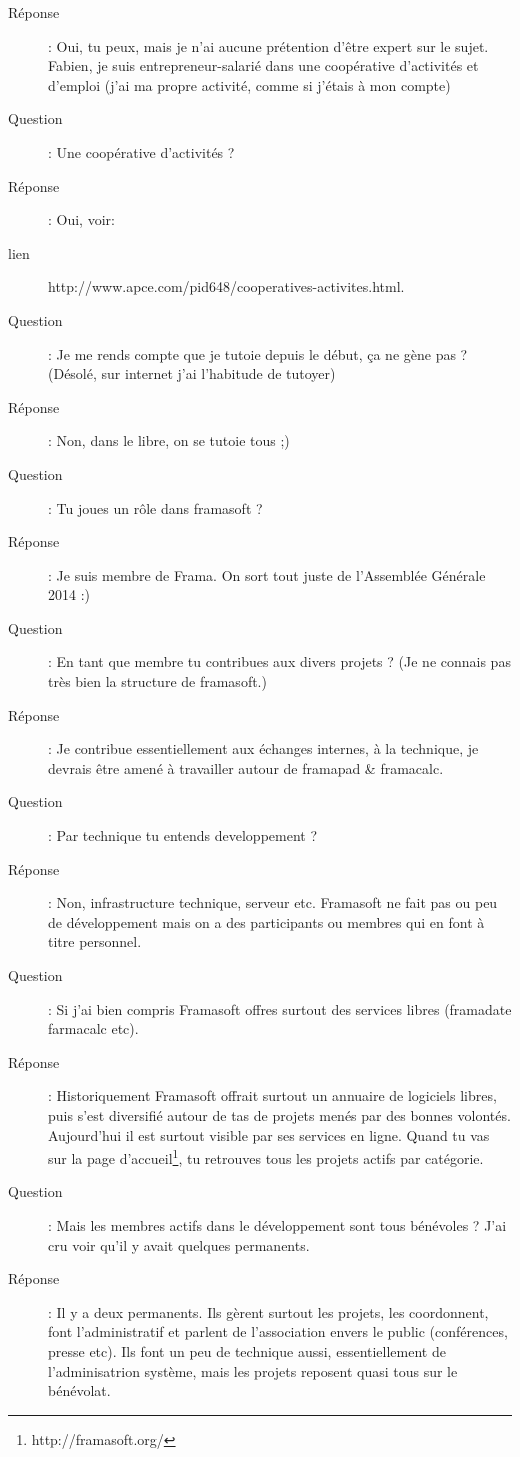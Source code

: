 \documentclass[a4paper,12pt, draft]{report}
\begin{document}
\begin{description}
\item [Réponse]:  Oui, tu peux, mais je n'ai aucune prétention d'être expert sur le sujet.  Fabien, je suis entrepreneur-salarié dans une coopérative d'activités et d'emploi (j'ai ma propre activité, comme si j'étais à mon compte)
\item [Question]:  Une coopérative d'activités ?
\item [Réponse]:  Oui, voir:
\item [lien] http://www.apce.com/pid648/cooperatives-activites.html.
\item [Question]:  Je me rends compte que je tutoie depuis le début, ça ne gène pas ? (Désolé, sur internet j'ai l'habitude de tutoyer)
\item [Réponse]:  Non, dans le libre, on se tutoie tous ;)
\item [Question]:  Tu joues un rôle dans framasoft ?
\item [Réponse]:  Je suis membre de Frama. On sort tout juste de l'Assemblée Générale 2014 :)
\item [Question]:  En tant que membre tu contribues aux divers projets ? (Je ne connais pas très bien la structure de framasoft.)
\item [Réponse]:  Je contribue essentiellement aux échanges internes, à la technique, je devrais être amené à travailler autour de framapad & framacalc.
\item [Question]:  Par technique tu entends developpement ?
\item [Réponse]:  Non, infrastructure technique, serveur etc. Framasoft ne fait pas ou peu de développement mais on a des participants ou membres qui en font à titre personnel.
\item [Question]:  Si j'ai bien compris Framasoft offres surtout des services libres (framadate farmacalc etc).
\item [Réponse]:  Historiquement Framasoft offrait surtout un annuaire de logiciels libres, puis s'est diversifié autour de tas de projets menés par des bonnes volontés. Aujourd'hui il est surtout visible par ses services en ligne. Quand tu vas sur la page d'accueil\footnote{http://framasoft.org/}, tu retrouves tous les projets actifs par catégorie.
\item [Question]:  Mais les membres actifs dans le développement sont tous bénévoles ? J'ai cru voir qu'il y avait quelques permanents.
\item [Réponse]:  Il y a deux permanents. Ils gèrent surtout les projets, les coordonnent, font l'administratif et parlent de l'association envers le public (conférences, presse etc). Ils font un peu de technique aussi, essentiellement de l'adminisatrion système, mais les projets reposent quasi tous sur le bénévolat.

\end{description}
\end{document}

